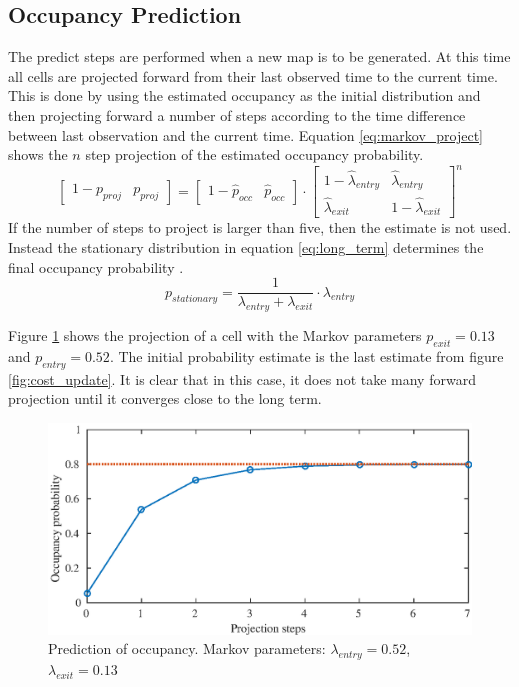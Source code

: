 \subsection{Occupancy Prediction}
The predict steps are performed when a new map is to be generated. At this time all cells are projected forward from their last observed time to the current time. This is done by using the estimated occupancy as the initial distribution and then projecting forward a number of steps according to the time difference between last observation and the current time.
Equation \ref{eq:markov_project} shows the $n$ step projection of the estimated occupancy probability.
\begin{equation}
\label{eq:markov_project}
\begin{bmatrix}
1-p_{proj} & p_{proj}
\end{bmatrix}
=
\begin{bmatrix}
1-\hat{p}_{occ} & \hat{p}_{occ}
\end{bmatrix}
\cdot
\begin{bmatrix}
1 - \hat{\lambda}_{entry} & \hat{\lambda}_{entry}\\ 
\hat{\lambda}_{exit} & 1- \hat{\lambda}_{exit}
\end{bmatrix}^n
\end{equation}
If the number of steps to project is larger than five, then the estimate is not used. Instead the stationary distribution in  equation \ref{eq:long_term} determines the final occupancy probability \cite{Meyer-Delius2012}.
\begin{equation}
	\label{eq:long_term}
	p_{stationary} = \frac{1}{\lambda_{entry} + \lambda_{exit}} \cdot \lambda_{entry}
\end{equation}

Figure \ref{fig:cost_predict} shows the projection of a cell with the Markov parameters \(p_{exit} = 0.13 \) and \(p_{entry} = 0.52 \). 
The initial probability estimate is the last estimate from figure \ref{fig:cost_update}. 
It is clear that in this case, it does not take many forward projection until it converges close to the long term. 

\begin{figure}[htbp]
	\centering
	\includegraphics[width=1\linewidth]{chapters/cost_interpretation/figures/projection}
	\caption{Prediction of occupancy. Markov parameters: \(\lambda_{entry} = 0.52\), \(\lambda_{exit} = 0.13\)}
	\label{fig:cost_predict}
\end{figure}

